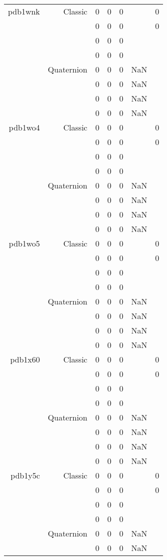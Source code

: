 \begin{xltabular}{\textwidth}{r|rcccSc}
pdb1wnk & Classic & 0 & 0 & 0 & & 0 \\
& & 0 & 0 & 0 & & 0 \\
& & 0 & 0 & 0 & & \\
& & 0 & 0 & 0 & & \\
& Quaternion & 0 & 0 & 0 & NaN & \\
& & 0 & 0 & 0 & NaN & \\
& & 0 & 0 & 0 & NaN & \\
& & 0 & 0 & 0 & NaN & \\ \addlinespace
pdb1wo4 & Classic & 0 & 0 & 0 & & 0 \\
& & 0 & 0 & 0 & & 0 \\
& & 0 & 0 & 0 & & \\
& & 0 & 0 & 0 & & \\
& Quaternion & 0 & 0 & 0 & NaN & \\
& & 0 & 0 & 0 & NaN & \\
& & 0 & 0 & 0 & NaN & \\
& & 0 & 0 & 0 & NaN & \\ \addlinespace
pdb1wo5 & Classic & 0 & 0 & 0 & & 0 \\
& & 0 & 0 & 0 & & 0 \\
& & 0 & 0 & 0 & & \\
& & 0 & 0 & 0 & & \\
& Quaternion & 0 & 0 & 0 & NaN & \\
& & 0 & 0 & 0 & NaN & \\
& & 0 & 0 & 0 & NaN & \\
& & 0 & 0 & 0 & NaN & \\ \addlinespace
pdb1x60 & Classic & 0 & 0 & 0 & & 0 \\
& & 0 & 0 & 0 & & 0 \\
& & 0 & 0 & 0 & & \\
& & 0 & 0 & 0 & & \\
& Quaternion & 0 & 0 & 0 & NaN & \\
& & 0 & 0 & 0 & NaN & \\
& & 0 & 0 & 0 & NaN & \\
& & 0 & 0 & 0 & NaN & \\ \addlinespace
pdb1y5c & Classic & 0 & 0 & 0 & & 0 \\
& & 0 & 0 & 0 & & 0 \\
& & 0 & 0 & 0 & & \\
& & 0 & 0 & 0 & & \\
& Quaternion & 0 & 0 & 0 & NaN & \\
& & 0 & 0 & 0 & NaN & \\

\end{xltabular}
